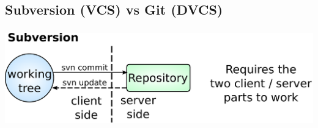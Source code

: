 
\subsection{Subversion (VCS) vs Git (DVCS)}
\begin{frame}
  \frametitle{\insertsubsection}
  \begin{center}
    \includegraphics[height=0.30\textheight]{images/pdf/svn-layout.pdf}
     \ \\ \vspacing \vspacing \vspacing
  \end{center}
\end{frame}


